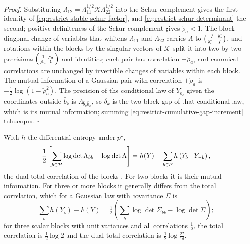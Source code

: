 \noindent\emph{Proof.}
Substituting \(\Lambda_{12}=\Lambda_{11}^{1/2}\mathcal K\Lambda_{22}^{1/2}\) into
the Schur complement gives the first identity of
\eqref{eq:restrict-stable-schur-factor}, and
\eqref{eq:restrict-schur-determinant} the second; positive definiteness of the
Schur complement gives \(\check\rho_a<1\). The block-diagonal change of variables
that whitens \(\Lambda_{11}\) and \(\Lambda_{22}\) carries \(\Lambda\) to
\(\begin{psmallmatrix}I&\mathcal K\\\mathcal K^\top&I\end{psmallmatrix}\), and
rotations within the blocks by the singular vectors of \(\mathcal K\) split it
into two-by-two precisions
\(\begin{psmallmatrix}1&\check\rho_a\\\check\rho_a&1\end{psmallmatrix}\) and identities;
each pair has correlation \(-\check\rho_a\), and canonical correlations are unchanged
by invertible changes of variables within each block. The mutual information
of a Gaussian pair with correlation \(\pm\check\rho_a\) is \(-\tfrac12\log(1-\check\rho_a^2)\).
The precision of the conditional law of \(Y_{\bar b_k}\) given the coordinates
outside \(\bar b_k\) is \(\Lambda_{\bar b_k\bar b_k}\), so \(\delta_k\) is the
two-block gap of that conditional law, which is its mutual information;
summing \eqref{eq:restrict-cumulative-gap-increment} telescopes. \(\square\)

With \(h\) the differential entropy under \(p^\star\),
\begin{equation}
\frac12\left[\sum_{b\in\mathcal P}\log\det\Lambda_{bb}-\log\det\Lambda\right]
=h(Y)-\sum_{b\in\mathcal P}h\left(Y_b\mid Y_{-b}\right),
\label{eq:restrict-gap-dual-total-correlation}
\end{equation}
the dual total correlation of the blocks \citep{Han1978}. For two blocks it is
their mutual information. For three or more blocks it generally differs from
the total correlation, which for a Gaussian law with covariance \(\Sigma\) is
\begin{equation}
\sum_bh(Y_b)-h(Y)
=\tfrac12\left(\sum_{b}\log\det\Sigma_{bb}-\log\det\Sigma\right);
\label{eq:elbo-total-correlation-gaussian}
\end{equation}
for three scalar blocks with unit variances and all correlations \(\tfrac12\),
the total correlation is \(\tfrac12\log2\) and the dual total correlation is
\(\tfrac12\log\tfrac{27}{16}\). 

